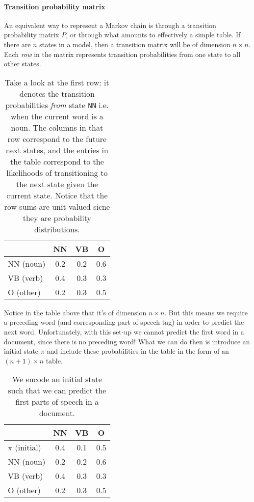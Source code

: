 \documentclass[12pt]{article}
\begin{document}
\paragraph{Transition probability matrix} An equivalent way to represent a Markov chain is through a transition probability matrix $P$, or through what amounts to effectively a simple table. If there are $n$ states in a model, then a transition matrix will be of dimension $n \times n$. Each \emph{row} in the matrix represents transition probabilities from one state to all other states.

\begin{table}[h]
  \begin{center}
    \begin{tabular}{|l | c | c | c|}
      \hline
      & NN & VB & O \\
      \hline
      NN {\color{gray} (noun)} & 0.2 & 0.2 & 0.6 \\
      \hline
      VB {\color{gray} (verb)} & 0.4 & 0.3 & 0.3 \\
      \hline
      O {\color{gray} (other)} & 0.2 & 0.3 & 0.5 \\
      \hline
    \end{tabular}
    \caption{Take a look at the first row: it denotes the transition probabilities \emph{from} state \texttt{NN} i.e. when the current word is a noun. The columns in that row correspond to the future next states, and the entries in the table correspond to the likelihoods of transitioning to the next state given the current state. Notice that the row-sums are unit-valued sicne they are probability distributions.}
  \end{center}
\end{table}

Notice in the table above that it's of dimension $n \times n$. But this means we require a preceding word (and corresponding part of speech tag) in order to predict the next word. Unfortunately, with this set-up we cannot predict the first word in a document, since there is no preceding word! What we can do then is introduce an initial state $\pi$ and include these probabilities in the table in the form of an $(n+1) \times n$ table.

\begin{table}[h]
  \begin{center}
    \begin{tabular}{|l | c | c | c|}
      \hline
      & NN & VB & O \\
      \hline
      $\pi$ {\color{gray} (initial)} & 0.4 & 0.1 & 0.5 \\
      \hline
      NN {\color{gray} (noun)} & 0.2 & 0.2 & 0.6 \\
      \hline
      VB {\color{gray} (verb)} & 0.4 & 0.3 & 0.3 \\
      \hline
      O {\color{gray} (other)} & 0.2 & 0.3 & 0.5 \\
      \hline
    \end{tabular}
    \label{tbl: initialmarkovtable}
    \caption{We encode an initial state such that we can predict the first parts of speech in a document.}
  \end{center}
\end{table}
\end{document}
